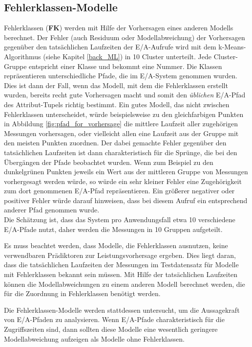 \documentclass[
	twoside,
	12pt,
	a4paper,
	BCOR10mm,
	DIV14,
	listof=totoc,
	bibliography=totoc,
	headsepline
]{scrreprt}
\begin{document}
\subsection{Fehlerklassen-Modelle}
\label{fk-modelle}
Fehlerklassen (\textbf{FK}) werden mit Hilfe der Vorhersagen eines anderen Modells berechnet. Der Fehler (auch Residuum oder Modellabweichung) der Vorhersagen gegenüber den tatsächlichen Laufzeiten der E/A-Aufrufe wird mit dem k-Means-Algorithmus (siehe Kapitel \ref{back_ML}) in 10 Cluster unterteilt.
Jede Cluster-Gruppe entspricht einer Klasse und bekommt eine Nummer. 
Die Klassen repräsentieren unterschiedliche Pfade, die im E/A-System genommen wurden. Dies ist dann der Fall, wenn das Modell, mit dem die Fehlerklassen erstellt wurden, bereits recht gute Vorhersagen macht und somit den \textit{üblichen} E/A-Pfad des Attribut-Tupels richtig bestimmt. 
Ein gutes Modell, das nicht zwischen Fehlerklassen unterscheidet, würde beispielsweise zu den gleichfarbigen Punkten in Abbildung \ref{fig:pfad_for_vorhersage} die mittlere Laufzeit aller zugehörigen Messungen vorhersagen, oder vielleicht allen eine Laufzeit aus der Gruppe mit den meisten Punkten zuordnen. 
Der dabei gemachte Fehler gegenüber den tatsächlichen Laufzeiten ist dann charakteristisch für die Sprünge, die bei den Übergängen der Pfade beobachtet wurden.
Wenn zum Beispiel zu den dunkelgrünen Punkten jeweils ein Wert aus der mittleren Gruppe von Messungen vorhergesagt werden würde, so würde ein sehr kleiner Fehler eine Zugehörigkeit zum dort genommenen E/A-Pfad repräsentieren.
Ein größerer negativer oder positiver Fehler würde darauf hinweisen, dass bei diesem Aufruf ein entsprechend anderer Pfad genommen wurde.\\
Die Schätzung ist, dass das System pro Anwendungsfall etwa 10 verschiedene E/A-Pfade nutzt, daher werden die Messungen in 10 Gruppen aufgeteilt.\medskip

Es muss beachtet werden, dass Modelle, die Fehlerklassen ausnutzen, keine verwendbaren Prädiktoren zur Leistungsvorhersage ergeben.
Dies liegt daran, dass die tatsächlichen Laufzeiten der Messungen im Testdatensatz für Modelle mit Fehlerklassen bekannt sein müssen. 
Mit Hilfe der tatsächlichen Laufzeiten können die Modellabweichungen zu einem anderen Modell berechnet werden, die für die Zuordnung in Fehlerklassen benötigt werden.\medskip

Die Fehlerklassen-Modelle werden stattdessen untersucht, um die Aussagekraft von E/A-Pfaden zu analysieren.
Wenn E/A-Pfade charakteristisch für die Zugriffszeiten sind, dann sollten diese Modelle eine wesentlich geringere Modellabweichung aufzeigen als Modelle ohne Fehlerklassen.
\end{document}
